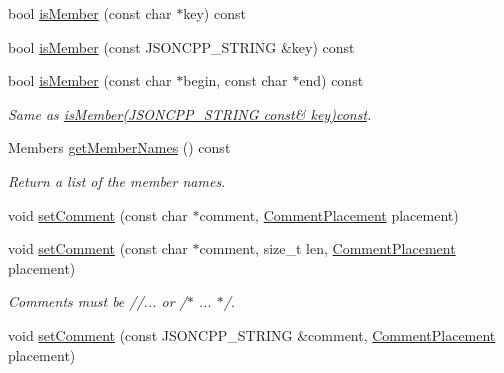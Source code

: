 \begin{DoxyCompactItemize}
bool \hyperlink{classJson_1_1Value_ad6d4df2227321bab05e86667609a7fad}{is\+Member} (const char $\ast$key) const
\item 
bool \hyperlink{classJson_1_1Value_a0c2cd838217b23ee6bde8135de1b30d9}{is\+Member} (const J\+S\+O\+N\+C\+P\+P\+\_\+\+S\+T\+R\+I\+NG \&key) const
\item 
\mbox{\label{classJson_1_1Value_a2007e1e51f21f44ecf1f13e4a1c567b9}} 
bool \hyperlink{classJson_1_1Value_a2007e1e51f21f44ecf1f13e4a1c567b9}{is\+Member} (const char $\ast$begin, const char $\ast$end) const
\begin{DoxyCompactList}\small\item\em Same as \hyperlink{classJson_1_1Value_a0c2cd838217b23ee6bde8135de1b30d9}{is\+Member(\+J\+S\+O\+N\+C\+P\+P\+\_\+\+S\+T\+R\+I\+N\+G const\& key)const}. \end{DoxyCompactList}\item 
Members \hyperlink{classJson_1_1Value_a79d7725dce6260317333e69022367ac9}{get\+Member\+Names} () const
\begin{DoxyCompactList}\small\item\em Return a list of the member names. \end{DoxyCompactList}\item 
void \hyperlink{classJson_1_1Value_a29f3a30f7e5d3af6f38d57999bf5b480}{set\+Comment} (const char $\ast$comment, \hyperlink{namespaceJson_a4fc417c23905b2ae9e2c47d197a45351}{Comment\+Placement} placement)
\item 
\mbox{\label{classJson_1_1Value_a2900152a2887b410a9ddabe278b9d492}} 
void \hyperlink{classJson_1_1Value_a2900152a2887b410a9ddabe278b9d492}{set\+Comment} (const char $\ast$comment, size\+\_\+t len, \hyperlink{namespaceJson_a4fc417c23905b2ae9e2c47d197a45351}{Comment\+Placement} placement)
\begin{DoxyCompactList}\small\item\em Comments must be //... or /$\ast$ ... $\ast$/. \end{DoxyCompactList}\item 
\mbox{\label{classJson_1_1Value_a2c5d13a5f45eb77e912008778e65b27f}} 
void \hyperlink{classJson_1_1Value_a2c5d13a5f45eb77e912008778e65b27f}{set\+Comment} (const J\+S\+O\+N\+C\+P\+P\+\_\+\+S\+T\+R\+I\+NG \&comment, \hyperlink{namespaceJson_a4fc417c23905b2ae9e2c47d197a45351}{Comment\+Placement} placement)

\end{DoxyCompactItemize}
